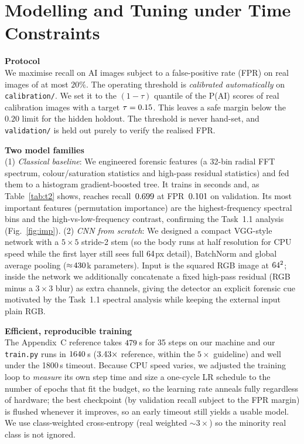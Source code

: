 \section{Modelling and Tuning under Time Constraints}
\textbf{Protocol}\\
 We maximise recall on AI images subject to a false-positive
rate (FPR) on real images of at most $20\%$. The operating threshold is
\emph{calibrated automatically} on \texttt{calibration/}. We set it to the
$(1-\tau)$ quantile of the P(AI) scores of real calibration images with a target
$\tau=0.15$. This leaves a safe margin below the $0.20$ limit for the hidden holdout. The threshold is never hand-set, and \texttt{validation/} is held out purely to
verify the realised FPR.

\textbf{Two model families}\\
 (1) \emph{Classical baseline}: We engineered forensic
features (a 32-bin radial FFT spectrum, colour/saturation statistics and
high-pass residual statistics) and fed them to a histogram gradient-boosted tree. It
trains in seconds and, as Table~\ref{tab:t2} shows, reaches
recall~$0.699$ at FPR~$0.101$ on validation. Its most important
features (permutation importance) are the highest-frequency spectral bins and
the high-vs-low-frequency contrast, confirming the Task~1.1 analysis
(Fig.~\ref{fig:imp}). (2) \emph{CNN from scratch}: We designed a compact VGG-style network
with a $5{\times}5$ stride-2 stem (so the body runs at half resolution for CPU
speed while the first layer still sees full $64$px detail), BatchNorm and
global average pooling ($\approx\!430$k parameters). Input is the squared
RGB image at $64^2$; inside the network we additionally concatenate a fixed
high-pass residual (RGB minus a $3{\times}3$ blur) as extra channels, giving the
detector an explicit forensic cue motivated by the Task~1.1 spectral analysis
while keeping the external input plain RGB.

\textbf{Efficient, reproducible training}\\
 The Appendix~C reference takes
$479$\,s for 35 steps on our machine and our \texttt{train.py} runs in
$1640$\,s ($3.43\times$ reference, within the $5\times$
guideline) and well under the 1800\,s timeout. Because CPU speed varies, we adjusted the
training loop to \emph{measure} its own step time and size a one-cycle LR
schedule to the number of epochs that fit the budget, so the learning rate
anneals fully regardless of hardware; the best checkpoint (by validation recall
subject to the FPR margin) is flushed whenever it improves, so an early timeout
still yields a usable model. We use class-weighted cross-entropy (real weighted
$\sim\!3\times$) so the minority real class is not ignored.

